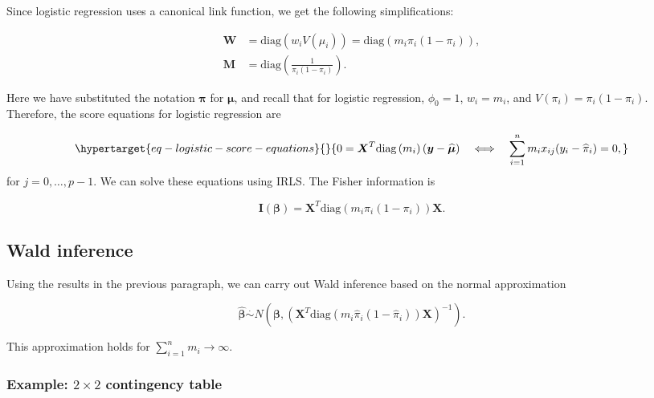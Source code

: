 \documentclass[
  11pt,
  letterpaper,
  oneside]{book}
\theoremstyle{plain}
\theoremstyle{plain}
\theoremstyle{definition}
\theoremstyle{definition}
\theoremstyle{plain}
\theoremstyle{remark}
\begin{document}
Since logistic regression uses a canonical link function, we get the
following simplifications:

\[
\begin{aligned}
\boldsymbol{W} &= \text{diag}\left(w_i V(\mu_i)\right) = \text{diag}\left(m_i \pi_i(1-\pi_i)\right), \\
\boldsymbol{M} &= \text{diag}\left(\frac{1}{\pi_i(1-\pi_i)}\right).
\end{aligned}
\]

Here we have substituted the notation \(\boldsymbol{\pi}\) for
\(\boldsymbol{\mu}\), and recall that for logistic regression,
\(\phi_0 = 1\), \(w_i = m_i\), and \(V(\pi_i) = \pi_i(1-\pi_i)\).
Therefore, the score equations for logistic regression are

\begin{equation}\protect\hypertarget{eq-logistic-score-equations}{}{
0 = \boldsymbol{X}^T \text{diag}\left(m_i\right)(\boldsymbol{y} - \boldsymbol{\widehat{\mu}}) \quad \Longleftrightarrow \quad \sum_{i = 1}^n m_i x_{ij}(y_i-\widehat{\pi}_i) = 0,
}\label{eq-logistic-score-equations}\end{equation} for
\(j = 0, \dots, p-1\). We can solve these equations using IRLS. The
Fisher information is

\[
\boldsymbol{I}(\boldsymbol{\beta}) = \boldsymbol{X}^T \text{diag}\left(m_i \pi_i(1-\pi_i)\right) \boldsymbol{X}.
\]

\hypertarget{sec-wald-inference}{%
\subsection{Wald inference}\label{sec-wald-inference}}

Using the results in the previous paragraph, we can carry out Wald
inference based on the normal approximation

\[
\boldsymbol{\widehat \beta} \overset \cdot \sim N\left(\boldsymbol \beta, \left(\boldsymbol X^T\text{diag}(m_i \widehat \pi_i(1-\widehat \pi_i))\boldsymbol X\right)^{-1}\right).
\]

This approximation holds for \(\sum_{i = 1}^n m_i \rightarrow \infty\).

\hypertarget{sec-2x2-contingency-table}{%
\subsubsection{\texorpdfstring{Example: \(2 \times 2\) contingency
table}{Example: 2 \textbackslash times 2 contingency table}}\label{sec-2x2-contingency-table}}
\end{document}
